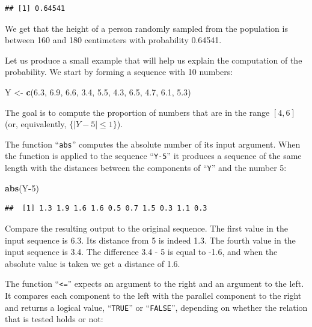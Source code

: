 \documentclass[]{krantz}
\makeatletter
\newenvironment{Shaded}{\begin{snugshade}}{\end{snugshade}}
\newcommand{\KeywordTok}[1]{\textcolor[rgb]{0.13,0.29,0.53}{\textbf{#1}}}
\newcommand{\DecValTok}[1]{\textcolor[rgb]{0.00,0.00,0.81}{#1}}
\newcommand{\FloatTok}[1]{\textcolor[rgb]{0.00,0.00,0.81}{#1}}
\newcommand{\StringTok}[1]{\textcolor[rgb]{0.31,0.60,0.02}{#1}}
\newcommand{\OperatorTok}[1]{\textcolor[rgb]{0.81,0.36,0.00}{\textbf{#1}}}
\newcommand{\NormalTok}[1]{#1}
\newenvironment{kframe}{%
\medskip{}
\setlength{\fboxsep}{.8em}
 \def\at@end@of@kframe{}%
 \ifinner\ifhmode%
  \def\at@end@of@kframe{\end{minipage}}%
  \begin{minipage}{\columnwidth}%
 \fi\fi%
 \def\FrameCommand##1{\hskip\@totalleftmargin \hskip-\fboxsep
 \colorbox{shadecolor}{##1}\hskip-\fboxsep
     \hskip-\linewidth \hskip-\@totalleftmargin \hskip\columnwidth}%
 \MakeFramed {\advance\hsize-\width
   \@totalleftmargin\z@ \linewidth\hsize
   \@setminipage}}%
 {\par\unskip\endMakeFramed%
 \at@end@of@kframe}
\renewenvironment{Shaded}{\begin{kframe}}{\end{kframe}}
\theoremstyle{definition}
\theoremstyle{definition}
\theoremstyle{definition}
\theoremstyle{remark}
\makeatother
\begin{document}
\begin{verbatim}
## [1] 0.64541
\end{verbatim}

We get that the height of a person randomly sampled from the population
is between 160 and 180 centimeters with probability 0.64541.

Let us produce a small example that will help us explain the computation
of the probability. We start by forming a sequence with 10 numbers:

\begin{Shaded}
\begin{Highlighting}[]
\NormalTok{Y <-}\StringTok{ }\KeywordTok{c}\NormalTok{(}\FloatTok{6.3}\NormalTok{, }\FloatTok{6.9}\NormalTok{, }\FloatTok{6.6}\NormalTok{, }\FloatTok{3.4}\NormalTok{, }\FloatTok{5.5}\NormalTok{, }\FloatTok{4.3}\NormalTok{, }\FloatTok{6.5}\NormalTok{, }\FloatTok{4.7}\NormalTok{, }\FloatTok{6.1}\NormalTok{, }\FloatTok{5.3}\NormalTok{)}
\end{Highlighting}
\end{Shaded}

The goal is to compute the proportion of numbers that are in the range
\([4,6]\) (or, equivalently, \(\{|Y-5| \leq 1\}\)).

The function ``\texttt{abs}'' computes the absolute number of its input
argument. When the function is applied to the sequence ``\texttt{Y-5}''
it produces a sequence of the same length with the distances between the
components of ``\texttt{Y}'' and the number 5:

\begin{Shaded}
\begin{Highlighting}[]
\KeywordTok{abs}\NormalTok{(Y}\OperatorTok{-}\DecValTok{5}\NormalTok{)}
\end{Highlighting}
\end{Shaded}

\begin{verbatim}
##  [1] 1.3 1.9 1.6 1.6 0.5 0.7 1.5 0.3 1.1 0.3
\end{verbatim}

Compare the resulting output to the original sequence. The first value
in the input sequence is 6.3. Its distance from 5 is indeed 1.3. The
fourth value in the input sequence is 3.4. The difference 3.4 - 5 is
equal to -1.6, and when the absolute value is taken we get a distance of
1.6.

The function ``\texttt{\textless{}=}'' expects an argument to the right
and an argument to the left. It compares each component to the left with
the parallel component to the right and returns a logical value,
``\texttt{TRUE}'' or ``\texttt{FALSE}'', depending on whether the
relation that is tested holds or not:
\end{document}
